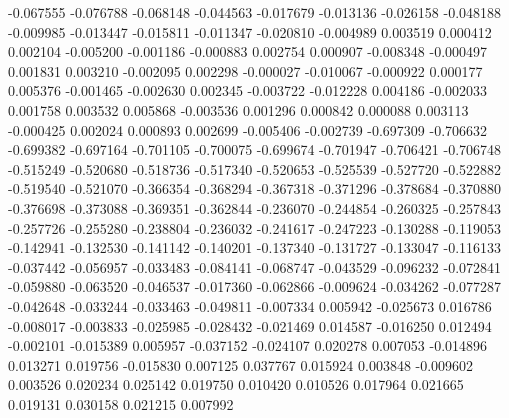 -0.067555
-0.076788
-0.068148
-0.044563
-0.017679
-0.013136
-0.026158
-0.048188
-0.009985
-0.013447
-0.015811
-0.011347
-0.020810
-0.004989
0.003519
0.000412
0.002104
-0.005200
-0.001186
-0.000883
0.002754
0.000907
-0.008348
-0.000497
0.001831
0.003210
-0.002095
0.002298
-0.000027
-0.010067
-0.000922
0.000177
0.005376
-0.001465
-0.002630
0.002345
-0.003722
-0.012228
0.004186
-0.002033
0.001758
0.003532
0.005868
-0.003536
0.001296
0.000842
0.000088
0.003113
-0.000425
0.002024
0.000893
0.002699
-0.005406
-0.002739
-0.697309
-0.706632
-0.699382
-0.697164
-0.701105
-0.700075
-0.699674
-0.701947
-0.706421
-0.706748
-0.515249
-0.520680
-0.518736
-0.517340
-0.520653
-0.525539
-0.527720
-0.522882
-0.519540
-0.521070
-0.366354
-0.368294
-0.367318
-0.371296
-0.378684
-0.370880
-0.376698
-0.373088
-0.369351
-0.362844
-0.236070
-0.244854
-0.260325
-0.257843
-0.257726
-0.255280
-0.238804
-0.236032
-0.241617
-0.247223
-0.130288
-0.119053
-0.142941
-0.132530
-0.141142
-0.140201
-0.137340
-0.131727
-0.133047
-0.116133
-0.037442
-0.056957
-0.033483
-0.084141
-0.068747
-0.043529
-0.096232
-0.072841
-0.059880
-0.063520
-0.046537
-0.017360
-0.062866
-0.009624
-0.034262
-0.077287
-0.042648
-0.033244
-0.033463
-0.049811
-0.007334
0.005942
-0.025673
0.016786
-0.008017
-0.003833
-0.025985
-0.028432
-0.021469
0.014587
-0.016250
0.012494
-0.002101
-0.015389
0.005957
-0.037152
-0.024107
0.020278
0.007053
-0.014896
0.013271
0.019756
-0.015830
0.007125
0.037767
0.015924
0.003848
-0.009602
0.003526
0.020234
0.025142
0.019750
0.010420
0.010526
0.017964
0.021665
0.019131
0.030158
0.021215
0.007992
